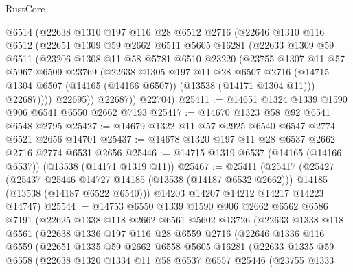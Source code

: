 \begin{lexlean}{RustCore}
\begin{coremodule}
        @6514
        (@22638
          @1310
          @197
          @116
          @28
          @6512
          @2716
          (@22646
            @1310
            @116
            @6512
            (@22651
              @1309
              @59
              @2662
              @6511
              @5605
              @16281
              (@22633
                @1309
                @59
                @6511
                (@23206
                  @1308
                  @11
                  @58
                  @5781
                  @6510
                  @23220
                  (@23755
                    @1307
                    @11
                    @57
                    @5967
                    @6509
                    @23769
                    (@22638
                      @1305
                      @197
                      @11
                      @28
                      @6507
                      @2716
                      (@14715 @1304 @6507 (@14165 (@14166 @6507)) (@13538 (@14171 @1304 @11)))
                      @22687))))
              @22695))
          @22687))
      @22704)
@25411 := @14651 @1324 @1339 @1590 @906 @6541 @6550 @2662 @7193
@25417 := @14670 @1323 @58 @92 @6541 @6548 @2795
@25427 := @14679 @1322 @11 @57 @2925 @6540 @6547 @2774 @6521 @2656 @14701
@25437 := @14678 @1320 @197 @11 @28 @6537 @2662 @2716 @2774 @6531 @2656
@25446 := @14715 @1319 @6537 (@14165 (@14166 @6537)) (@13538 (@14171 @1319 @11))
@25467 := @25411
    (@25417
      (@25427
        (@25437 @25446 @14727 @14185 (@13538 (@14187 @6532 @2662)))
        @14185
        (@13538 (@14187 @6522 @6540)))
      @14203
      @14207
      @14212
      @14217
      @14223
      @14747)
@25544 := @14753
    @6550
    @1339
    @1590
    @906
    @2662
    @6562
    @6586
    @7191
    (@22625
      @1338
      @118
      @2662
      @6561
      @5602
      @13726
      (@22633
        @1338
        @118
        @6561
        (@22638
          @1336
          @197
          @116
          @28
          @6559
          @2716
          (@22646
            @1336
            @116
            @6559
            (@22651
              @1335
              @59
              @2662
              @6558
              @5605
              @16281
              (@22633
                @1335
                @59
                @6558
                (@22638
                  @1320
                  @1334
                  @11
                  @58
                  @6537
                  @6557
                  @25446
                  (@23755
                    @1333

\end{coremodule}
\end{lexlean}
